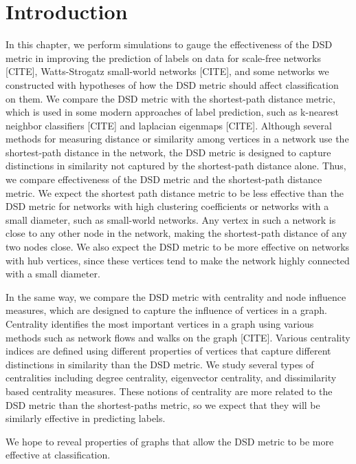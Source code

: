 \section{Introduction}

In this chapter, we perform simulations to gauge the effectiveness of the DSD metric in improving the prediction of labels on data for scale-free networks [CITE], Watts-Strogatz small-world networks [CITE], and some networks we constructed with hypotheses of how the DSD metric should affect classification on them. We compare the DSD metric with the shortest-path distance metric, which is used in some modern approaches of label prediction, such as k-nearest neighbor classifiers [CITE] and laplacian eigenmaps [CITE]. Although several methods for measuring distance or similarity among vertices in a network use the shortest-path distance in the network, the DSD metric is designed to capture distinctions in similarity not captured by the shortest-path distance alone. Thus, we compare effectiveness of the DSD metric and the shortest-path distance metric. We expect the shortest path distance metric to be less effective than the DSD metric for networks with high clustering coefficients or networks with a small diameter, such as small-world networks. Any vertex in such a network is close to any other node in the network, making the shortest-path distance of any two nodes close. We also expect the DSD metric to be more effective on networks with hub vertices, since these vertices tend to make the network highly connected with a small diameter.

In the same way, we compare the DSD metric with centrality and node influence measures, which are designed to capture the influence of vertices in a graph. Centrality identifies the most important vertices in a graph using various methods such as network flows and walks on the graph [CITE]. Various centrality indices are defined using different properties of vertices that capture different distinctions in similarity than the DSD metric. We study several types of centralities including degree centrality, eigenvector centrality, and dissimilarity based centrality measures. These notions of centrality are more related to the DSD metric than the shortest-paths metric, so we expect that they will be similarly effective in predicting labels.

We hope to reveal properties of graphs that allow the DSD metric to be more effective at classification.


